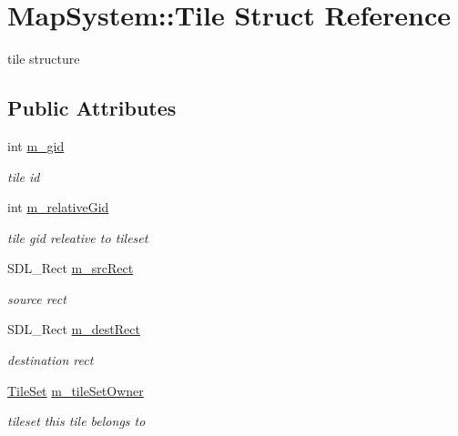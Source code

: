 \hypertarget{struct_map_system_1_1_tile}{}\section{Map\+System\+:\+:Tile Struct Reference}
\label{struct_map_system_1_1_tile}


tile structure  


\subsection*{Public Attributes}
\begin{DoxyCompactItemize}
\item 
\mbox{\label{struct_map_system_1_1_tile_acb98dd3a5231a21b209fa25d54a41308}} 
int \mbox{\hyperlink{struct_map_system_1_1_tile_acb98dd3a5231a21b209fa25d54a41308}{m\+\_\+gid}}
\begin{DoxyCompactList}\small\item\em tile id \end{DoxyCompactList}\item 
\mbox{\label{struct_map_system_1_1_tile_a4ccd083ccbcd2b6f2c75a511e6dc04c7}} 
int \mbox{\hyperlink{struct_map_system_1_1_tile_a4ccd083ccbcd2b6f2c75a511e6dc04c7}{m\+\_\+relative\+Gid}}
\begin{DoxyCompactList}\small\item\em tile gid releative to tileset \end{DoxyCompactList}\item 
\mbox{\label{struct_map_system_1_1_tile_a139af12a84d5ce469f052113e0b663fd}} 
S\+D\+L\+\_\+\+Rect \mbox{\hyperlink{struct_map_system_1_1_tile_a139af12a84d5ce469f052113e0b663fd}{m\+\_\+src\+Rect}}
\begin{DoxyCompactList}\small\item\em source rect \end{DoxyCompactList}\item 
\mbox{\label{struct_map_system_1_1_tile_ae87d01a57580ab3818c0177595178e95}} 
S\+D\+L\+\_\+\+Rect \mbox{\hyperlink{struct_map_system_1_1_tile_ae87d01a57580ab3818c0177595178e95}{m\+\_\+dest\+Rect}}
\begin{DoxyCompactList}\small\item\em destination rect \end{DoxyCompactList}\item 
\mbox{\label{struct_map_system_1_1_tile_a7b25e9409073cf30bba740c2dc184632}} 
\mbox{\hyperlink{struct_map_system_1_1_tile_set}{Tile\+Set}} \mbox{\hyperlink{struct_map_system_1_1_tile_a7b25e9409073cf30bba740c2dc184632}{m\+\_\+tile\+Set\+Owner}}
\begin{DoxyCompactList}\small\item\em tileset this tile belongs to \end{DoxyCompactList}\end{DoxyCompactItemize}


